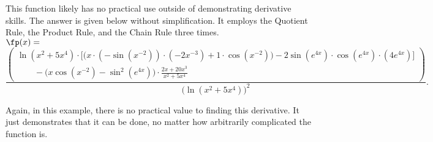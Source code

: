 {This function likely has no practical use outside of demonstrating derivative skills. The answer is given below without simplification. It employs the Quotient Rule, the Product Rule, and the Chain Rule three times.\\

\scriptsize
\noindent $\fp(x) = $
$$\frac{\left(\begin{array}{l}\ln(x^2+5x^4)\cdot\Big[\big(x\cdot(-\sin(x^{-2}))\cdot(-2x^{-3})+1\cdot \cos(x^{-2})\big)-2\sin(e^{4x})\cdot\cos(e^{4x})\cdot(4e^{4x})\Big]\\
\qquad-\Big(x\cos(x^{-2})-\sin^2(e^{4x})\Big)\cdot\frac{2x+20x^3}{x^2+5x^4}\end{array}\right)}{\big(\ln(x^2+5x^4)\big)^2}.$$
\normalsize

Again, in this example, there is no practical value to finding this derivative. It just demonstrates that it can be done, no matter how arbitrarily complicated the function is.
}\\

